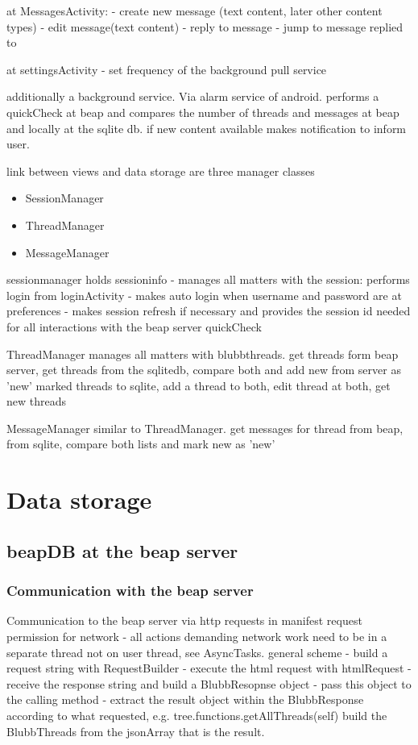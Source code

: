 \documentclass[12pt,a4paper,oneside]{report}
\begin{document}
at MessagesActivity:
- create new message (text content, later other content types)
- edit message(text content)
- reply to message
- jump to message replied to

at settingsActivity
- set frequency of the background pull service

additionally a background service. Via alarm service of android.
performs a quickCheck at beap and compares the number of threads and messages at beap and locally at the sqlite db. if new content available makes notification to inform user.

link between views and data storage are three manager classes
\begin{itemize}
\item{SessionManager}
\item{ThreadManager}
\item{MessageManager}
\end{itemize}

sessionmanager holds sessioninfo - manages all matters with the session: performs login from loginActivity - makes auto login when username and password are at preferences - makes session refresh if necessary and provides the session id needed for all interactions with the beap server quickCheck 

ThreadManager manages all matters with blubbthreads. get threads form beap server, get threads from the sqlitedb, compare both and add new from server as 'new' marked threads to sqlite, add a thread to both, edit thread at both, get new threads

MessageManager similar to ThreadManager. get messages for thread from beap, from sqlite, compare both lists and mark new as 'new' 



\section{Data storage}

\subsection{beapDB at the beap server}

\subsubsection{Communication with the beap server}
Communication to the beap server via http requests 
in manifest request permission for network - all actions demanding network work need to be in a separate thread not on user thread, see AsyncTasks.
general scheme
	- build a request string with RequestBuilder
	- execute the html request with htmlRequest
	- receive the response string and build a BlubbResopnse object
	- pass this object to the calling method
	- extract the result object within the BlubbResponse according to what requested, e.g. tree.functions.getAllThreads(self) build the BlubbThreads from the jsonArray that is the result.
	
\end{document}
